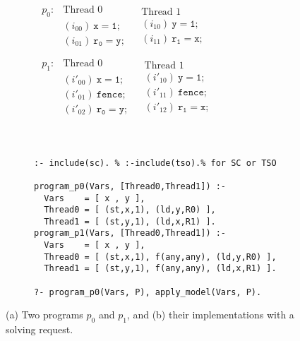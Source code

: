 \begin{figure}
\begin{subfigure}{.495\textwidth}
\vspace*{2.5mm}
\begin{small}
$\begin{array}{c||c}
  \begin{array}{rl}
p_0{:} &
    \text{Thread~0} \\
&(i_{00})~    \mathtt{x = 1;} \\
&(i_{01})~    \mathtt{r_0 = y;} \\
  \end{array} &
  \begin{array}{l}
    \text{Thread~1} \\
(i_{10})~    \mathtt{y = 1;} \\
(i_{11})~    \mathtt{r_1 = x;} \\
  \end{array}
\end{array}$\\[4mm]
$
\begin{array}{c||c}
  \begin{array}{rl}
p_1{:} & \text{Thread~0} \\
&(i'_{00})~    \mathtt{x = 1;} \\
&(i'_{01})~    \mathtt{fence ;} \\
&(i'_{02})~    \mathtt{r_0 = y;} \\
  \end{array} &
  \begin{array}{l}
\text{Thread~1} \\
(i'_{10})~    \mathtt{y = 1;} \\
(i'_{11})~    \mathtt{fence ;} \\
(i'_{12})~    \mathtt{r_1 = x;} \\
  \end{array}
\end{array}
$
\end{small}
~
\end{subfigure}
\begin{subfigure}{.495\textwidth}
\begin{lstlisting}[language=chr]
:- include(sc). % :-include(tso).% for SC or TSO 

program_p0(Vars, [Thread0,Thread1]) :- 
  Vars    = [ x , y ],
  Thread0 = [ (st,x,1), (ld,y,R0) ],
  Thread1 = [ (st,y,1), (ld,x,R1) ].
program_p1(Vars, [Thread0,Thread1]) :-  
  Vars    = [ x , y ],
  Thread0 = [ (st,x,1), f(any,any), (ld,y,R0) ],
  Thread1 = [ (st,y,1), f(any,any), (ld,x,R1) ].

?- program_p0(Vars, P), apply_model(Vars, P).
\end{lstlisting}
\end{subfigure}
\vspace*{-3mm}
\caption{(a) Two programs $p_0$ and $p_1$,
and (b) their implementations with a solving request.}
\vspace*{-4mm}
\label{fig:programs}
\end{figure}



